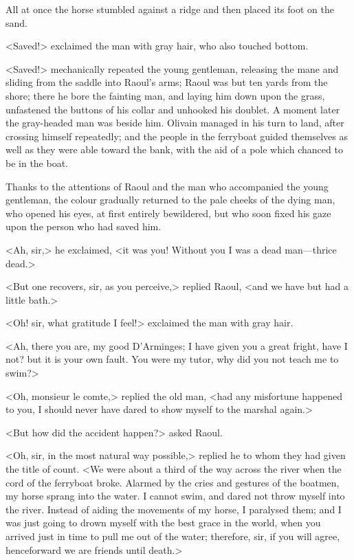 All at once the horse stumbled against a ridge and then placed its foot on the sand.

<Saved!> exclaimed the man with gray hair, who also touched bottom.

<Saved!> mechanically repeated the young gentleman, releasing the mane and sliding from the saddle into Raoul's arms; Raoul was but ten yards from the shore; there he bore the fainting man, and laying him down upon the grass, unfastened the buttons of his collar and unhooked his doublet. A moment later the gray-headed man was beside him. Olivain managed in his turn to land, after crossing himself repeatedly; and the people in the ferryboat guided themselves as well as they were able toward the bank, with the aid of a pole which chanced to be in the boat.

Thanks to the attentions of Raoul and the man who accompanied the young gentleman, the colour gradually returned to the pale cheeks of the dying man, who opened his eyes, at first entirely bewildered, but who soon fixed his gaze upon the person who had saved him.

<Ah, sir,> he exclaimed, <it was you! Without you I was a dead man—thrice dead.>

<But one recovers, sir, as you perceive,> replied Raoul, <and we have but had a little bath.>

<Oh! sir, what gratitude I feel!> exclaimed the man with gray hair.

<Ah, there you are, my good D'Arminges; I have given you a great fright, have I not? but it is your own fault. You were my tutor, why did you not teach me to swim?>

<Oh, monsieur le comte,> replied the old man, <had any misfortune happened to you, I should never have dared to show myself to the marshal again.>

<But how did the accident happen?> asked Raoul.

<Oh, sir, in the most natural way possible,> replied he to whom they had given the title of count. <We were about a third of the way across the river when the cord of the ferryboat broke. Alarmed by the cries and gestures of the boatmen, my horse sprang into the water. I cannot swim, and dared not throw myself into the river. Instead of aiding the movements of my horse, I paralysed them; and I was just going to drown myself with the best grace in the world, when you arrived just in time to pull me out of the water; therefore, sir, if you will agree, henceforward we are friends until death.>

